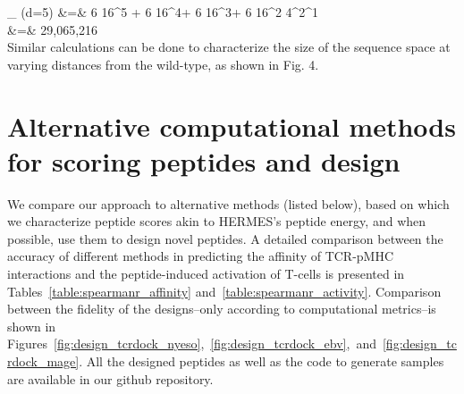 \EQA
\nonumber \Omega_ (d=5) &=& {6 } 16^5 + {6 } 16^4\times {}+
{6 } 16^3\times {}+ 
{6 }16^2    4^2^1  \\
\nonumber&=& 29,065,216\\
\EEA
Similar calculations can be done to characterize the size of the sequence space at varying distances
from the wild-type, as shown in Fig. 4.

\section{Alternative computational methods for scoring peptides and design}
\label{sec:AltModel}
 We compare our approach to alternative methods (listed below), based on which we characterize
 peptide scores akin to HERMES's peptide energy, and when possible, use them to design novel
 peptides. A detailed comparison between the accuracy of different methods in predicting the
 affinity of TCR-pMHC interactions and the peptide-induced activation of T-cells is presented in
 Tables~\ref{table:spearmanr_affinity} and~\ref{table:spearmanr_activity}. Comparison between the
 fidelity of the designs--only according to computational metrics--is shown in
 Figures~\ref{fig:design_tcrdock_nyeso},~\ref{fig:design_tcrdock_ebv},~and~\ref{fig:design_tcrdock_mage}.
 All the designed peptides as well as the code to generate samples are available in our github
 repository.

